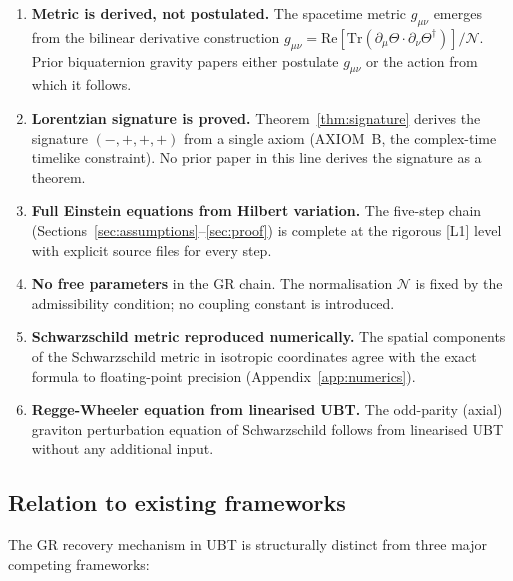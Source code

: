 \documentclass[12pt,a4paper]{article}
\theoremstyle{definition}
\theoremstyle{remark}
\begin{document}
\begin{enumerate}
\item \textbf{Metric is derived, not postulated.}
      The spacetime metric $g_{\mu\nu}$ emerges from the bilinear derivative
      construction $g_{\mu\nu} = \mathrm{Re}[\mathrm{Tr}(\partial_\mu\Theta
      \cdot\partial_\nu\Theta^\dagger)]/\mathcal{N}$.
      Prior biquaternion gravity papers either postulate $g_{\mu\nu}$ or the
      action from which it follows.

\item \textbf{Lorentzian signature is proved.}
      Theorem~\ref{thm:signature} derives the signature $(-,+,+,+)$ from a
      single axiom (AXIOM~B, the complex-time timelike constraint).  No prior
      paper in this line derives the signature as a theorem.

\item \textbf{Full Einstein equations from Hilbert variation.}
      The five-step chain (Sections~\ref{sec:assumptions}--\ref{sec:proof})
      is complete at the rigorous [L1] level with explicit source files for
      every step.

\item \textbf{No free parameters} in the GR chain.
      The normalisation $\mathcal{N}$ is fixed by the admissibility condition;
      no coupling constant is introduced.

\item \textbf{Schwarzschild metric reproduced numerically.}
      The spatial components of the Schwarzschild metric in isotropic coordinates
      agree with the exact formula to floating-point precision (Appendix~\ref{app:numerics}).

\item \textbf{Regge-Wheeler equation from linearised UBT.}
      The odd-parity (axial) graviton perturbation equation of Schwarzschild
      follows from linearised UBT without any additional input.
\end{enumerate}

\subsection{Relation to existing frameworks}

The GR recovery mechanism in UBT is structurally distinct from three major
competing frameworks:
\end{document}
